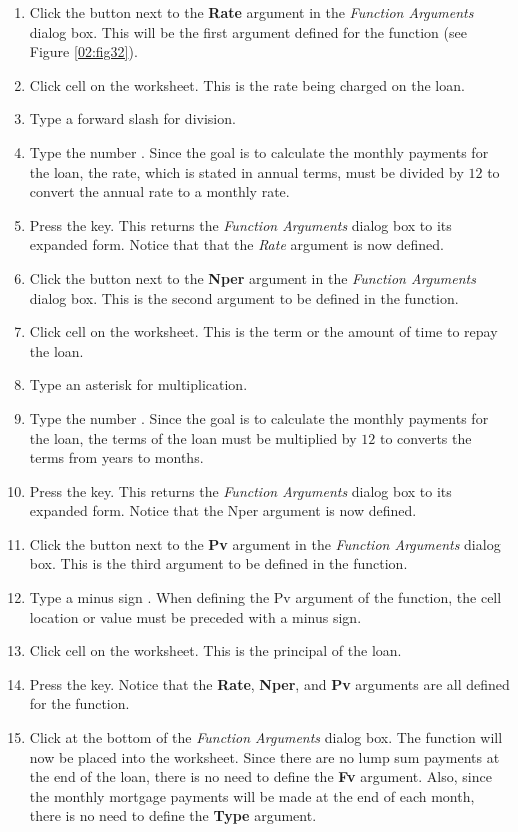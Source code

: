 \begin{enumerate}[resume]
	\item Click the  button next to the \textbf{Rate} argument in the \textit{Function Arguments} dialog box. This will be the first argument defined for the function (see Figure \ref{02:fig32}).
	\item Click cell  on the worksheet. This is the rate being charged on the loan.
	\item Type a forward slash \fmtTyping{/} for division.
	\item Type the number . Since the goal is to calculate the monthly payments for the loan, the rate, which is stated in annual terms, must be divided by $ 12 $ to convert the annual rate to a monthly rate.
	\item Press the  key. This returns the \textit{Function Arguments} dialog box to its expanded form. Notice that that the \textit{Rate} argument is now defined.
	\item Click the  button next to the \textbf{Nper} argument in the \textit{Function Arguments} dialog box. This is the second argument to be defined in the function.
	\item Click cell  on the worksheet. This is the term or the amount of time to repay the loan.
	\item Type an asterisk \fmtTyping{*} for multiplication.
	\item Type the number . Since the goal is to calculate the monthly payments for the loan, the terms of the loan must be multiplied by $ 12 $ to converts the terms from years to months.
	\item Press the  key. This returns the \textit{Function Arguments} dialog box to its expanded form. Notice that the Nper argument is now defined.
	\item Click the  button next to the \textbf{Pv} argument in the \textit{Function Arguments} dialog box. This is the third argument to be defined in the function.
	\item Type a minus sign \fmtTyping{-}. When defining the Pv argument of the  function, the cell location or value must be preceded with a minus sign.
	\item Click cell  on the worksheet. This is the principal of the loan.
	\item Press the  key. Notice that the \textbf{Rate}, \textbf{Nper}, and \textbf{Pv} arguments are all defined for the function.
	\item Click  at the bottom of the \textit{Function Arguments} dialog box. The function will now be placed into the worksheet. Since there are no lump sum payments at the end of the loan, there is no need to define the \textbf{Fv} argument. Also, since the monthly mortgage payments will be made at the end of each month, there is no need to define the \textbf{Type} argument.
\end{enumerate}

